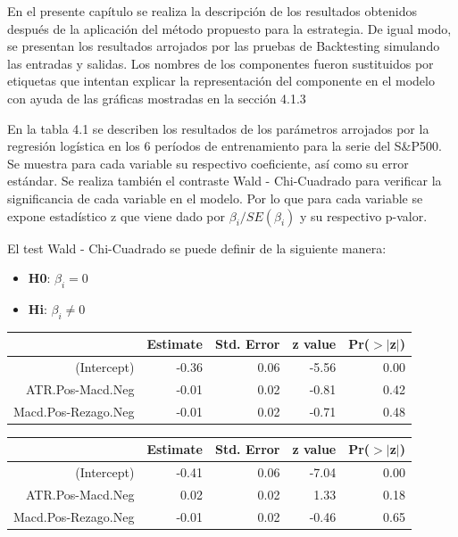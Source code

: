 \documentclass[a4paper,12pt]{Latex/Classes/PhDthesisPSnPDF}
\begin{document}
En el presente capítulo se realiza la descripción de los resultados obtenidos después de la aplicación del método propuesto para la estrategia. De igual modo, se presentan los resultados arrojados por las pruebas de Backtesting simulando las entradas y salidas. Los nombres de los componentes fueron sustituidos por etiquetas que intentan explicar la representación del componente en el modelo con ayuda de las gráficas mostradas en la sección 4.1.3


En la tabla 4.1 se describen los resultados de los parámetros arrojados por la regresión logística en los 6 períodos de entrenamiento para la serie del S\&P500. Se muestra para cada variable su respectivo coeficiente, así como su error estándar. Se realiza también el contraste Wald - Chi-Cuadrado para verificar la significancia de cada variable en el modelo. Por lo que para cada variable se expone estadístico z que viene dado por $\beta_{i}/SE(\beta_{i})$ y su respectivo p-valor.

El test Wald - Chi-Cuadrado se puede definir de la siguiente manera:

\begin{itemize}
\item \textbf{H0}: $\beta_{i} = 0$
\item \textbf{Hi}: $\beta_{i} \neq 0$
\end{itemize}

\begin{center}
\begin{table}[ht]
\centering
\begin{tabular}{rrrrr}
  \hline
 & Estimate & Std. Error & z value & Pr($>$$|$z$|$) \\ 
  \hline
(Intercept) & -0.36 & 0.06 & -5.56 & 0.00 \\ 
  ATR.Pos-Macd.Neg & -0.01 & 0.02 & -0.81 & 0.42 \\ 
  Macd.Pos-Rezago.Neg & -0.01 & 0.02 & -0.71 & 0.48 \\ 
   \hline
\end{tabular}
\end{table}\end{center}

\begin{center}
\begin{table}[ht]
\centering
\begin{tabular}{rrrrr}
  \hline
 & Estimate & Std. Error & z value & Pr($>$$|$z$|$) \\ 
  \hline
(Intercept) & -0.41 & 0.06 & -7.04 & 0.00 \\ 
  ATR.Pos-Macd.Neg & 0.02 & 0.02 & 1.33 & 0.18 \\ 
  Macd.Pos-Rezago.Neg & -0.01 & 0.02 & -0.46 & 0.65 \\ 
   \hline
\end{tabular}
\end{table}\end{center}
\end{document}
